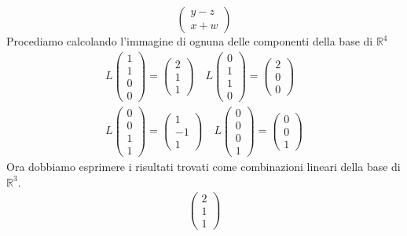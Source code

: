 \begin{example}
\begin{equation*}
\begin{pmatrix}
			y - z     \\
			x + w
		\end{pmatrix}
	\end{equation*}
	Procediamo calcolando l'immagine di ognuna delle componenti della base di
	$\mathbb{R}^4$
	\begin{gather*}
		L \begin{pmatrix}
			1 \\ 1 \\ 0 \\ 0
		\end{pmatrix} =
		\begin{pmatrix}
			2 \\ 1 \\ 1
		\end{pmatrix} \quad
		L \begin{pmatrix}
			0 \\ 1 \\ 1 \\ 0
		\end{pmatrix} =
		\begin{pmatrix}
			2 \\ 0 \\ 0
		\end{pmatrix} \\
		L \begin{pmatrix}
			0 \\ 0 \\ 1 \\ 1
		\end{pmatrix} =
		\begin{pmatrix}
			1 \\ -1 \\ 1
		\end{pmatrix} \quad
		L \begin{pmatrix}
			0 \\ 0 \\ 0 \\ 1
		\end{pmatrix} =
		\begin{pmatrix}
			0 \\ 0 \\ 1
		\end{pmatrix}
	\end{gather*}
	Ora dobbiamo esprimere i risultati trovati come combinazioni lineari della base di
	$\mathbb{R}^3$.
	\begin{gather*}
		\begin{pmatrix}
			2 \\ 1 \\ 1

\end{pmatrix}
\end{gather*}
\end{example}
